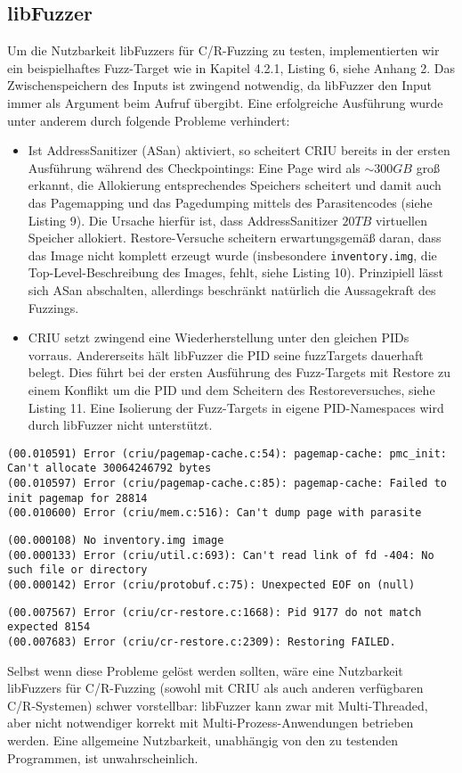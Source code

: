 \documentclass[a4paper]{article}
\begin{document}
\subsection{libFuzzer}
Um die Nutzbarkeit libFuzzers für C/R-Fuzzing zu testen, implementierten wir ein beispielhaftes Fuzz-Target wie in Kapitel 4.2.1, Listing 6, siehe Anhang 2.
Das Zwischenspeichern des Inputs ist zwingend notwendig, da libFuzzer den Input immer als Argument beim Aufruf übergibt. 
Eine erfolgreiche Ausführung wurde unter anderem durch folgende Probleme verhindert:
\begin{itemize}
    \item Ist AddressSanitizer\cite{adsan} (ASan) aktiviert, so scheitert CRIU bereits in der ersten Ausführung während des Checkpointings: Eine Page wird als $\sim 300GB$ groß erkannt, die Allokierung entsprechendes Speichers scheitert und damit auch das Pagemapping und das Pagedumping mittels des Parasitencodes (siehe Listing 9). 
        Die Ursache hierfür ist, dass AddressSanitizer $20TB$ virtuellen Speicher allokiert\cite{aflasan}. Restore-Versuche scheitern erwartungsgemäß daran, dass das Image nicht komplett erzeugt wurde (insbesondere \texttt{inventory.img}, die Top-Level-Beschreibung des Images, fehlt, siehe Listing 10).
        Prinzipiell lässt sich ASan abschalten, allerdings beschränkt natürlich die Aussagekraft des Fuzzings.
    \item CRIU setzt zwingend eine Wiederherstellung unter den gleichen PIDs vorraus. Andererseits hält libFuzzer die PID seine fuzzTargets dauerhaft belegt. Dies führt bei der ersten Ausführung des Fuzz-Targets mit Restore zu einem Konflikt um die PID und dem Scheitern des Restoreversuches, siehe Listing 11. Eine Isolierung der Fuzz-Targets in eigene PID-Namespaces wird durch libFuzzer nicht unterstützt.
\end{itemize}
\begin{lstlisting}[caption=Pagemapping/dumping Errors mit ASan]
(00.010591) Error (criu/pagemap-cache.c:54): pagemap-cache: pmc_init: Can't allocate 30064246792 bytes
(00.010597) Error (criu/pagemap-cache.c:85): pagemap-cache: Failed to init pagemap for 28814
(00.010600) Error (criu/mem.c:516): Can't dump page with parasite
\end{lstlisting}
\begin{lstlisting}[caption=Restoring Error mit ASan]
(00.000108) No inventory.img image
(00.000133) Error (criu/util.c:693): Can't read link of fd -404: No such file or directory
(00.000142) Error (criu/protobuf.c:75): Unexpected EOF on (null)
\end{lstlisting}
\begin{lstlisting}[caption=Restoring Error durch PID mismatch]
(00.007567) Error (criu/cr-restore.c:1668): Pid 9177 do not match expected 8154
(00.007683) Error (criu/cr-restore.c:2309): Restoring FAILED.
\end{lstlisting}
Selbst wenn diese Probleme gelöst werden sollten, wäre eine Nutzbarkeit libFuzzers für C/R-Fuzzing (sowohl mit CRIU als auch anderen verfügbaren C/R-Systemen) schwer vorstellbar: libFuzzer kann zwar mit Multi-Threaded, aber nicht notwendiger korrekt mit Multi-Prozess-Anwendungen betrieben werden. Eine allgemeine Nutzbarkeit, unabhängig von den zu testenden Programmen, ist unwahrscheinlich.
\end{document}
